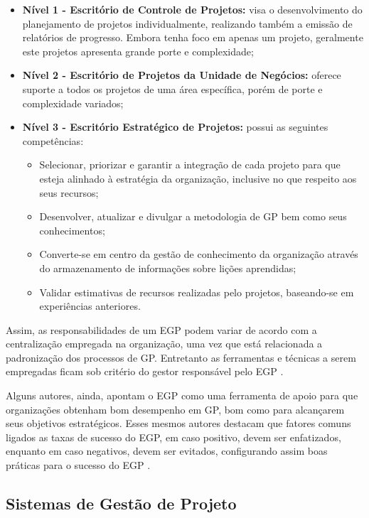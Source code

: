   \begin{itemize}
    \item \textbf{Nível 1 - Escritório de Controle de Projetos:} visa o desenvolvimento do planejamento de projetos individualmente, realizando também a emissão de relatórios de progresso. Embora tenha foco em apenas um projeto, geralmente este projetos apresenta grande porte e complexidade;
    \item \textbf{Nível 2 - Escritório de Projetos da Unidade de Negócios:} oferece suporte a todos os projetos de uma área específica, porém de porte e complexidade variados;
    \item \textbf{Nível 3 - Escritório Estratégico de Projetos:} possui as seguintes competências:
    \begin{itemize}
      \item Selecionar, priorizar e garantir a integração de cada projeto para que esteja alinhado à estratégia da organização, inclusive no que respeito aos seus recursos;
      \item Desenvolver, atualizar e divulgar a metodologia de GP bem como seus conhecimentos;
      \item Converte-se em centro da gestão de conhecimento da organização através do armazenamento de informações sobre lições aprendidas;
      \item Validar estimativas de recursos realizadas pelo projetos, baseando-se em experiências anteriores.
    \end{itemize}
  \end{itemize}

  Assim, as responsabilidades de um EGP podem variar de acordo com a centralização empregada na organização, uma vez que está relacionada a padronização dos processos de GP. Entretanto as ferramentas e técnicas a serem empregadas ficam sob critério do gestor responsável pelo EGP \cite{pmiguide2014}.

  Alguns autores, ainda, apontam o EGP como uma ferramenta de apoio para que organizações obtenham bom desempenho em GP, bom como para alcançarem seus objetivos estratégicos. Esses mesmos autores destacam que fatores comuns ligados as taxas de sucesso do EGP, em caso positivo, devem ser enfatizados, enquanto em caso negativos, devem ser evitados, configurando assim boas práticas para o sucesso do EGP \cite{andersen2007benchmarking}.

\subsection{Sistemas de Gestão de Projeto}

